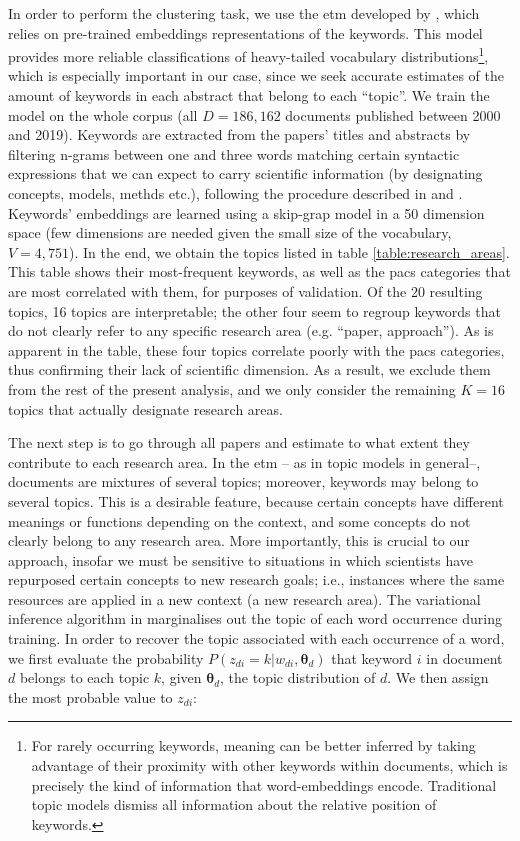 \documentclass{article}
\begin{document}
In order to perform the clustering task, we use the \gls{etm} developed by \citealt{Dieng2020}, which relies on pre-trained embeddings representations of the keywords. This model provides more reliable classifications of heavy-tailed vocabulary distributions\footnote{For rarely occurring keywords, meaning can be better inferred by taking advantage of their proximity with other keywords within documents, which 
is precisely the kind of information that word-embeddings encode. Traditional topic models dismiss all information about the relative position of keywords.}, which is especially important in our case, since we seek accurate estimates of the amount of keywords in each abstract that belong to each ``topic''. We train the model on the whole corpus (all $D=186,162$ documents published between 2000 and 2019). Keywords are extracted from the papers' titles and abstracts by filtering n-grams between one and three words matching certain syntactic expressions that we can expect to carry scientific information (by designating concepts, models, methds etc.), following the procedure described in \citealt{Gautheron2023} and \citealt{omodei_tel-01097702}. Keywords' embeddings are learned using a skip-grap model in a 50 dimension space (few dimensions are needed given the small size of the vocabulary, $V=4,751$). In the end, we obtain the topics listed in table \ref{table:research_areas}. This table shows their most-frequent keywords, as well as the \gls{pacs} categories that are most correlated with them, for purposes of validation. Of the 20 resulting topics, 16 topics are interpretable; the other four seem to regroup keywords that do not clearly refer to any specific research area (e.g. ``paper, approach''). As is apparent in the table, these four topics correlate poorly with the \gls{pacs} categories, thus confirming their lack of scientific dimension. As a result, we exclude them from the rest of the present analysis, and we only consider the remaining $K=16$ topics that actually designate research areas.

The next step is to go through all papers and estimate to what extent they contribute to each research area. In the \gls{etm} -- as in topic models in general--, documents are mixtures of several topics; moreover, keywords may belong to several topics. This is a desirable feature, because certain concepts have different meanings or functions depending on the context, and some concepts do not clearly belong to any research area. More importantly, this is crucial to our approach, insofar we must be sensitive to situations in which scientists have repurposed certain concepts to new research goals; i.e., instances where the same resources are applied in a new context (a new research area). The variational inference algorithm in \citet{Dieng2020} marginalises out the topic of each word occurrence during training. In order to recover the topic associated with each occurrence of a word, we first evaluate the probability $P(z_{di}=k|w_{di},\bm{\theta}_{d})$ that keyword $i$ in document $d$ belongs to each topic $k$, given $\bm{\theta}_d$, the topic distribution of $d$. We then assign the most probable value to $z_{di}$:
\end{document}
